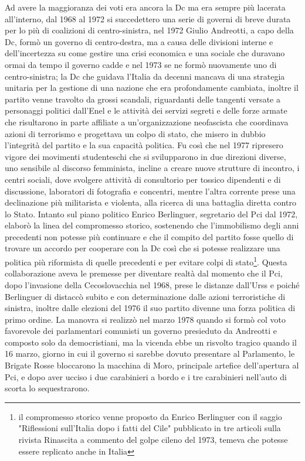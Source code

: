 Ad avere la maggioranza dei voti era ancora la Dc ma era sempre più lacerata all'interno, dal 1968 al 1972 si succedettero una serie di governi di breve durata per lo più di coalizioni di centro-sinistra, nel 1972 Giulio Andreotti, a capo della Dc, formò un governo di centro-destra, ma a causa delle divisioni interne e dell'incertezza su come gestire una crisi economica e una sociale che duravano ormai da tempo il governo cadde e nel 1973 se ne formò nuovamente uno di centro-sinistra; la Dc che guidava l'Italia da decenni mancava di una strategia unitaria per la gestione di una nazione che era profondamente cambiata, inoltre il partito venne travolto da grossi scandali, riguardanti delle tangenti versate a personaggi politici dall'Enel e le attività dei servizi segreti e delle forze armate che risultarono in parte affiliate a un'organizzazione neofascista che coordinava azioni di terrorismo e progettava un colpo di stato, che misero in dubbio l'integrità del partito e la sua capacità politica.
Fu così che nel 1977 ripresero vigore dei movimenti studenteschi che si svilupparono in due direzioni diverse, uno sensibile al discorso femminista, incline a creare nuove strutture di incontro, i centri sociali, dove svolgere attività di consultorio per tossico dipendenti e di discussione, laboratori di fotografia e concentri, mentre l'altra corrente prese una declinazione più militarista e violenta, alla ricerca di una battaglia diretta contro lo Stato.
Intanto sul piano politico Enrico Berlinguer, segretario del Pci dal 1972, elaborò la linea del compromesso storico, sostenendo che l'immobilismo degli anni precedenti non potesse più continuare e che il compito del partito fosse quello di trovare un accordo per cooperare con la Dc così che si potesse realizzare una politica più riformista di quelle precedenti e per evitare colpi di stato\footnote{il compromesso storico venne proposto da Enrico Berlinguer con il saggio "Riflessioni sull'Italia dopo i fatti del Cile" pubblicato in tre articoli sulla rivista Rinascita a commento del golpe cileno del 1973, temeva che potesse essere replicato anche in Italia}.
Questa collaborazione aveva le premesse per diventare realtà dal momento che il Pci, dopo l'invasione della Cecoslovacchia nel 1968, prese le distanze dall'Urss e poiché Berlinguer di distaccò subito e con determinazione dalle azioni terroristiche di sinistra, inoltre dalle elezioni del 1976 il suo partito divenne una forza politica di primo ordine.
La manovra si realizzò nel marzo 1978 quando si formò col voto favorevole dei parlamentari comunisti un governo presieduto da Andreotti e composto solo da democristiani, ma la vicenda ebbe un risvolto tragico quando il 16 marzo, giorno in cui il governo si sarebbe dovuto presentare al Parlamento, le Brigate Rosse bloccarono la macchina di Moro, principale artefice dell'apertura al Pci, e dopo aver ucciso i due carabinieri a bordo e i tre carabinieri nell'auto di scorta lo sequestrarono.
